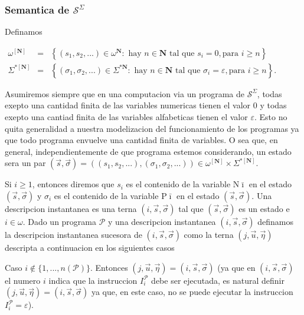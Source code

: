 \subsubsection{Semantica de \(\mathcal{S}^{\Sigma }\)}


Definamos

\(\displaystyle \begin{array}{rcl} \omega ^{\left[ \mathbf{N}\right] } & =& \left\{ (s_{1},s_{2},...)\in \omega ^{ \mathbf{N}}:\text{ hay }n\in \mathbf{N}\text{ tal que }s_{i}=0,\text{para } i\geq n\right\} \\ \Sigma ^{\ast \left[ \mathbf{N}\right] } & =& \left\{ (\sigma _{1},\sigma _{2},...)\in \Sigma ^{\ast \mathbf{N}}:\text{ hay }n\in \mathbf{N}\text{ tal que }\sigma _{i}=\varepsilon ,\text{para }i\geq n\right\} . \end{array} \)

Asumiremos siempre que en una computacion via un programa de \(\mathcal{S} ^{\Sigma }\), todas exepto una cantidad finita de las variables numericas tienen el valor \(0\) y todas exepto una cantiad finita de las variables alfabeticas tienen el valor \(\varepsilon \). Esto no quita generalidad a nuestra modelizacion del funcionamiento de los programas ya que todo programa envuelve una cantidad finita de variables. O sea que, en general, independientemente de que programa estemos considerando, un estado sera un par
\(\displaystyle (\vec{s},\vec{\sigma})=((s_{1},s_{2},...),(\sigma _{1},\sigma _{2},...))\in \omega ^{\left[ \mathbf{N}\right] }\times \Sigma ^{\ast \left[ \mathbf{N} \right] }. \)

Si \(i\geq 1\), entonces diremos que \(s_{i}\) es el contenido de la variable \(\mathrm{N}\bar{\imath}\) en el estado \((\vec{s},\vec{\sigma})\) y \( \sigma _{i}\) es el contenido de la variable \(\mathrm{P}\bar{\imath}\) en el estado \((\vec{s},\vec{\sigma})\).
Una descripcion instantanea es una terna \((i,\vec{s},\vec{\sigma})\) tal que \((\vec{s},\vec{\sigma})\) es un estado e \(i\in \omega \). Dado un programa \(\mathcal{P}\) y una descripcion instantanea \((i,\vec{s},\vec{\sigma} )\) definamos la descripcion instantanea sucesora de \((i,\vec{s}, \vec{\sigma})\) como la terna \((j,\vec{u},\vec{\eta})\) descripta a continuacion en los siguientes casos

Caso \(i\notin \{1,...,n(\mathcal{P})\}.\) Entonces \((j,\vec{u},\vec{\eta})=(i, \vec{s},\vec{\sigma})\) (ya que en \((i,\vec{s},\vec{\sigma})\) el numero \(i\) indica que la instruccion \(I_{i}^{\mathcal{P}}\) debe ser ejecutada, es natural definir \((j,\vec{u},\vec{\eta})=(i,\vec{s},\vec{\sigma})\) ya que, en este caso, no se puede ejecutar la instruccion \(I_{i}^{\mathcal{P} }=\varepsilon \)).

